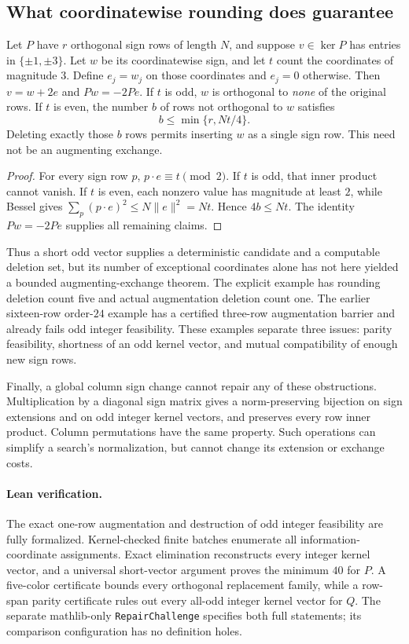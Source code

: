 \subsection{What coordinatewise rounding does guarantee}
\begin{proposition}
Let $P$ have $r$ orthogonal sign rows of length $N$, and suppose
$v\in\ker P$ has entries in $\{\pm1,\pm3\}$. Let $w$ be its
coordinatewise sign, and let $t$ count the coordinates of magnitude
$3$. Define $e_j=w_j$ on those coordinates and $e_j=0$ otherwise.
Then $v=w+2e$ and $Pw=-2Pe$.
If $t$ is odd, $w$ is orthogonal to \emph{none} of the original rows.
If $t$ is even, the number $b$ of rows not orthogonal to $w$ satisfies
\[
 b\le\min\{r,Nt/4\}.
\]
Deleting exactly those $b$ rows permits inserting $w$ as a single
sign row. This need not be an augmenting exchange.
\end{proposition}
\begin{proof}
For every sign row $p$, $p\cdot e\equiv t\pmod2$. If $t$ is odd,
that inner product cannot vanish. If $t$ is even, each nonzero value
has magnitude at least $2$, while Bessel gives
$\sum_p(p\cdot e)^2\le N\|e\|^2=Nt$. Hence $4b\le Nt$.
The identity $Pw=-2Pe$ supplies all remaining claims.
\end{proof}

Thus a short odd vector supplies a deterministic candidate and a
computable deletion set, but its number of exceptional coordinates
alone has not here yielded a bounded augmenting-exchange theorem.
The explicit example has rounding deletion count five and actual
augmentation deletion count one. The earlier sixteen-row order-$24$
example has a certified three-row augmentation barrier and already
fails odd integer feasibility. These examples separate three issues:
parity feasibility, shortness of an odd kernel vector, and mutual
compatibility of enough new sign rows.

Finally, a global column sign change cannot repair any of these
obstructions. Multiplication by a diagonal sign matrix gives a
norm-preserving bijection on sign extensions and on odd integer kernel
vectors, and preserves every row inner product. Column permutations
have the same property. Such operations can simplify a search's
normalization, but cannot change its extension or exchange costs.

\paragraph{Lean verification.}
The exact one-row augmentation and destruction of odd integer feasibility are fully formalized. Kernel-checked finite batches enumerate all information-coordinate assignments. Exact elimination reconstructs every integer kernel vector, and a universal short-vector argument proves the minimum $40$ for $P$. A five-color certificate bounds every orthogonal replacement family, while a row-span parity certificate rules out every all-odd integer kernel vector for $Q$. The separate mathlib-only \texttt{RepairChallenge} specifies both full statements; its comparison configuration has no definition holes.
